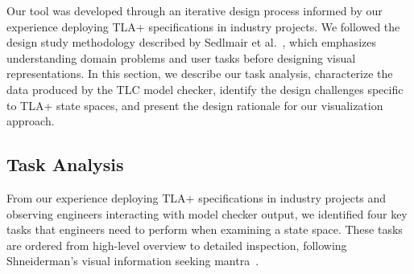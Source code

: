 \documentclass[conference]{IEEEtran}
\begin{document}
Our tool was developed through an iterative design process informed by our experience deploying TLA+ specifications in industry projects. We followed the design study methodology described by Sedlmair et al.~\cite{sedlmair2012design}, which emphasizes understanding domain problems and user tasks before designing visual representations. In this section, we describe our task analysis, characterize the data produced by the TLC model checker, identify the design challenges specific to TLA+ state spaces, and present the design rationale for our visualization approach.

\subsection{Task Analysis}

From our experience deploying TLA+ specifications in industry projects and observing engineers interacting with model checker output, we identified four key tasks that engineers need to perform when examining a state space. These tasks are ordered from high-level overview to detailed inspection, following Shneiderman's visual information seeking mantra~\cite{shneiderman1996eyes}.
\end{document}

